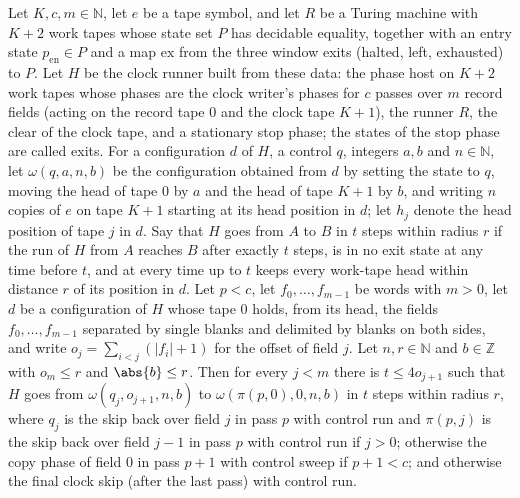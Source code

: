 \begin{lemma}
\label{Turing.cw_rewind}
\leanok
{}
Let $K,c,m\in\mathbb{N}$, let $e$ be a tape symbol, and let $R$ be a Turing machine with $K+2$
work tapes whose state set $P$ has decidable equality, together with an entry state
$p_{\mathrm{en}}\in P$ and a map $\mathrm{ex}$ from the three window exits (halted, left,
exhausted) to $P$. Let $H$ be the clock runner built from these data: the phase host on $K+2$
work tapes whose phases are the clock writer's phases for $c$ passes over $m$ record fields
(acting on the record tape $0$ and the clock tape $K+1$), the runner $R$, the clear of the
clock tape, and a stationary stop phase; the states of the stop phase are called exits. For a
configuration $d$ of $H$, a control $q$, integers $a,b$ and $n\in\mathbb{N}$, let
$\omega(q,a,n,b)$ be the configuration obtained from $d$ by setting the state to $q$, moving
the head of tape $0$ by $a$ and the head of tape $K+1$ by $b$, and writing $n$ copies of $e$ on
tape $K+1$ starting at its head position in $d$; let $h_j$ denote the head position of tape $j$
in $d$. Say that $H$ goes from $A$ to $B$ in $t$ steps within radius $r$ if the run of $H$ from
$A$ reaches $B$ after exactly $t$ steps, is in no exit state at any time before $t$, and at
every time up to $t$ keeps every work-tape head within distance $r$ of its position in $d$. Let
$p<c$, let $f_0,\dots,f_{m-1}$ be words with $m>0$, let $d$ be a configuration of $H$ whose
tape $0$ holds, from its head, the fields $f_0,\dots,f_{m-1}$ separated by single blanks and
delimited by blanks on both sides, and write $o_j=\sum_{i<j}(|f_i|+1)$ for the offset of field
$j$. Let $n,r\in\mathbb{N}$ and $b\in\mathbb{Z}$ with $o_m\le r$ and $\abs{b}\le r$. Then for
every $j<m$ there is $t\le 4o_{j+1}$ such that $H$ goes from $\omega(q_j,o_{j+1},n,b)$ to
$\omega(\pi(p,0),0,n,b)$ in $t$ steps within radius $r$, where $q_j$ is the skip back over
field $j$ in pass $p$ with control run and $\pi(p,j)$ is the skip back over field $j-1$ in pass
$p$ with control run if $j>0$; otherwise the copy phase of field $0$ in pass $p+1$ with control
sweep if $p+1<c$; and otherwise the final clock skip (after the last pass) with control run.
\end{lemma}

